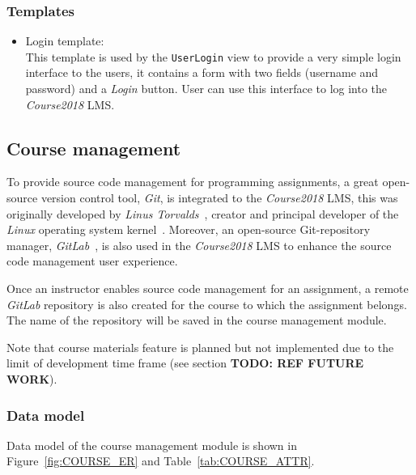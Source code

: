 \subsubsection{Templates}

\begin{itemize}
    \item Login template: \\
        This template is used by the \texttt{UserLogin} view to provide a very
        simple login interface to the users, it contains a form with two
        fields (username and password) and a \emph{Login} button. User can
        use this interface to log into the \emph{Course2018} LMS.
\end{itemize}



\subsection{Course management}
To provide source code management for programming assignments,
a great open-source version control tool,
\emph{Git}, is integrated to the \emph{Course2018} LMS,
this was originally developed by \emph{Linus Torvalds}~\cite{git},
creator and principal developer of the \emph{Linux} operating system
kernel~\cite{lTorvalds}.
Moreover, 
an open-source Git-repository manager, \emph{GitLab}~\cite{gitlab}, is also
used in the \emph{Course2018} LMS to enhance the source code management user
experience.

\medskip
Once an instructor enables source code management for an assignment, a remote
\emph{GitLab} repository is also created for the course to which the assignment
belongs. The name of the repository will be saved in the course management
module.

\medskip
Note that course materials feature is planned but not implemented due to the
limit of development time frame (see section {\bf TODO: REF FUTURE WORK}).

\subsubsection{Data model}
Data model of the course management module is shown in
Figure~\ref{fig:COURSE_ER} and Table~\ref{tab:COURSE_ATTR}. \bigskip

